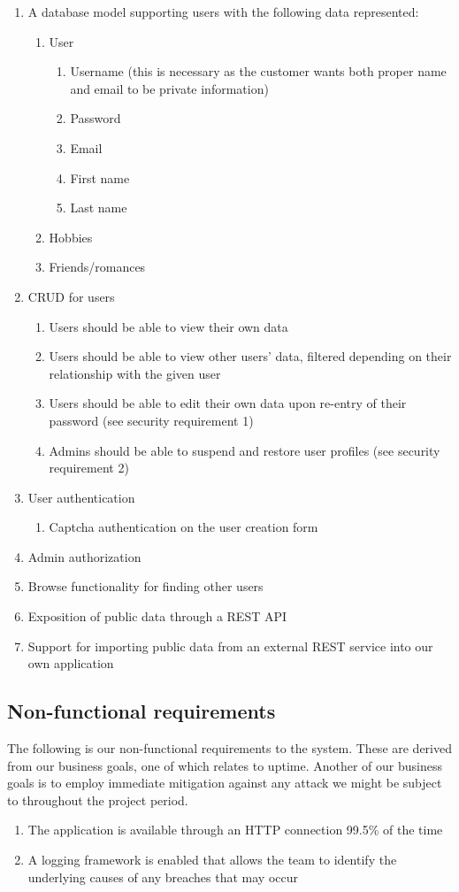 \documentclass[a4paper]{article}
\begin{document}
\begin{enumerate}
\item A database model supporting users with the following data represented:
  \begin{enumerate}
  \item User
      \begin{enumerate}
      \item Username (this is necessary as the customer wants both proper name and email to be private information)
      \item Password
      \item Email
      \item First name
      \item Last name
      \end{enumerate}
  \item Hobbies
  \item Friends/romances
  \end{enumerate}
\item CRUD for users
	\begin{enumerate}
    \item Users should be able to view their own data
    \item Users should be able to view other users' data, filtered depending on their relationship with the given user
    \item Users should be able to edit their own data upon re-entry of their password (see security requirement 1)
    \item Admins should be able to suspend and restore user profiles (see security requirement 2)
    \end{enumerate}
\item User authentication
	\begin{enumerate}
	\item Captcha authentication on the user creation form
	\end{enumerate}
\item Admin authorization
\item Browse functionality for finding other users
\item Exposition of public data through a REST API
\item Support for importing public data from an external REST service into our own application
\end{enumerate}

\subsection{Non-functional requirements}
The following is our non-functional requirements to the system. These are derived from our business goals, one of which relates to uptime. Another of our business goals is to employ immediate mitigation against any attack we might be subject to throughout the project period.
\begin{enumerate}
\item The application is available through an HTTP connection 99.5\% of the time
\item A logging framework is enabled that allows the team to identify the underlying causes of any breaches that may occur
\end{enumerate}
\end{document}
